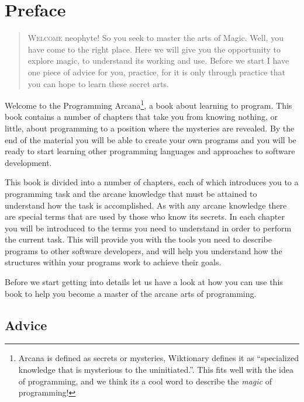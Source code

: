 \chapter*{Preface} %
\label{cha:preface}

\begin{quote}
  \Fontlukas\Large
  \renewcommand{\LettrineTextFont}{\relax}
  \lettrine[image=true,lines=3,lraise=0.1]
  {W}{elcome} neophyte!  So you seek to master the arts of Magic. Well, you have come to the right place. Here we will give you the opportunity to explore magic, to understand its working and use. Before we start I have one piece of advice for you, practice, for it is only through practice that you can hope to learn these secret arts.
\end{quote}

\bigskip

Welcome to the Programming Arcana\footnote{Arcana is defined as secrets or mysteries, Wiktionary defines it as ``specialized knowledge that is mysterious to the uninitiated.''. This fits well with the idea of programming, and we think its a cool word to describe the \emph{magic} of programming!}, a book about learning to program. This book contains a number of chapters that take you from knowing nothing, or little, about programming to a position where the mysteries are revealed. By the end of the material you will be able to create your own programs and you will be ready to start learning other programming languages and approaches to software development.

This book is divided into a number of chapters, each of which introduces you to a programming task and the arcane knowledge that must be attained to understand how the task is accomplished. As with any arcane knowledge there are special terms that are used by those who know its secrets. In each chapter you will be introduced to the terms you need to understand in order to perform the current task. This will provide you with the tools you need to describe programs to other software developers, and will help you understand how the structures within your programs work to achieve their goals.

Before we start getting into details let us have a look at how you can use this book to help you become a master of the arcane arts of programming.




\section*{Advice} %
\label{sec:advice}

